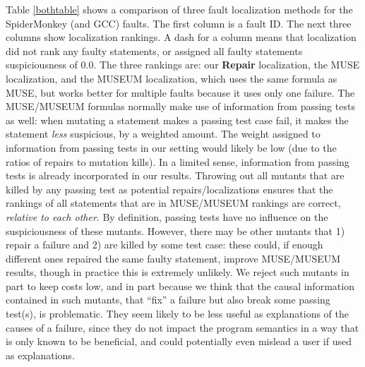 Table \ref{bothtable} shows a comparison of three fault localization methods for the SpiderMonkey (and GCC) faults.  The first column is a fault ID. The next three columns show localization rankings.  A dash for a column means that localization did not rank any faulty statements, or assigned all faulty statements suspiciousness of 0.0.  The three rankings are: our {\bf Repair} localization, the MUSE \cite{MUSE} localization, and the MUSEUM \cite{multilingual} localization, which uses the same formula as MUSE, but works better for multiple faults because it uses only one failure.  The MUSE/MUSEUM formulas normally make use of information from passing tests as well: when mutating a statement makes a passing test case fail, it makes the statement \emph{less} suspicious, by a weighted amount. The weight assigned to information from passing tests in our setting would likely be low (due to the ratios of repairs to mutation kills).  In a limited sense, information from passing tests is already incorporated in our results.  Throwing out all mutants that are killed by any passing test as potential repairs/localizations ensures that the rankings of all statements that are in MUSE/MUSEUM rankings are correct, \emph{relative to each other}.  By definition, passing tests have no influence on the suspiciousness of these mutants.  However, there may be other mutants that 1) repair a failure and 2) are killed by some test case: these could, if enough different ones repaired the same faulty statement, improve MUSE/MUSEUM results, though in practice this is extremely unlikely.  We reject such mutants in part to keep costs low, and in part because we think that the causal information contained in such mutants, that ``fix'' a failure but also break some passing test(s), is problematic.  They seem likely to be less useful as explanations of the causes of a failure, since they do not impact the program semantics in a way that is only known to be beneficial, and could potentially even mislead a user if used as explanations.  

